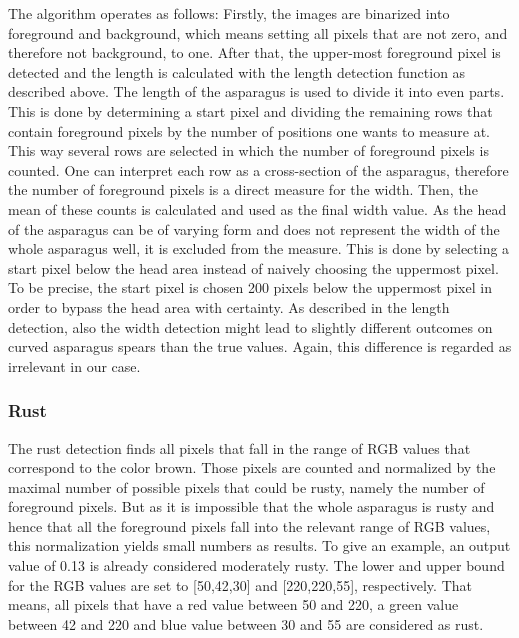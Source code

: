\bigskip
The algorithm operates as follows: Firstly, the images are binarized into foreground and background, which means setting all pixels that are not zero, and therefore not background, to one. After that, the upper-most foreground pixel is detected and the length is calculated with the length detection function as described above. The length of the asparagus is used to divide it into even parts. This is done by determining a start pixel and dividing the remaining rows that contain foreground pixels by the number of positions one wants to measure at. This way several rows are selected in which the number of foreground pixels is counted. One can interpret each row as a cross-section of the asparagus, therefore the number of foreground pixels is a direct measure for the width. Then, the mean of these counts is calculated and used as the final width value. As the head of the asparagus can be of varying form and does not represent the width of the whole asparagus well, it is excluded from the measure. This is done by selecting a start pixel below the head area instead of naively choosing the uppermost pixel. To be precise, the start pixel is chosen 200 pixels below the uppermost pixel in order to bypass the head area with certainty. As described in the length detection, also the width detection might lead to slightly different outcomes on curved asparagus spears than the true values. Again, this difference is regarded as irrelevant in our case.

\subsubsection{Rust}
\label{subsec:Rust}

The rust detection finds all pixels that fall in the range of RGB values that correspond to the color brown. Those pixels are counted and normalized by the maximal number of possible pixels that could be rusty, namely the number of foreground pixels. But as it is impossible that the whole asparagus is rusty and hence that all the foreground pixels fall into the relevant range of RGB values, this normalization yields small numbers as results. To give an example, an output value of 0.13 is already considered moderately rusty. The lower and upper bound for the RGB values are set to [50,42,30] and [220,220,55], respectively. That means, all pixels that have a red value between 50 and 220, a green value between 42 and 220 and blue value between 30 and 55 are considered as rust.

